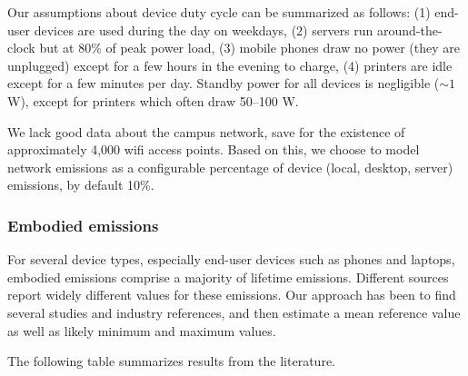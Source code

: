 \documentclass[11pt]{article}
\begin{document}
Our assumptions about device duty cycle can be summarized as follows: (1) end-user devices are used during the day on weekdays, (2) servers run around-the-clock but at 80\% of peak power load, (3) mobile phones draw no power (they are unplugged) except for a few hours in the evening to charge, (4) printers are idle except for a few minutes per day. Standby power for all devices is negligible ($\sim 1$ W), except for printers which often draw 50--100 W.

We lack good data about the campus network, save for the existence of approximately 4,000 wifi access points. Based on this, we choose to model network emissions as a configurable percentage of device (local, desktop, server) emissions, by default 10\%.

\subsubsection*{Embodied emissions}

For several device types, especially end-user devices such as phones and laptops, embodied emissions
comprise a majority of lifetime emissions. Different sources report widely different values for these emissions. Our approach has been to find several studies and industry references, and then estimate a mean reference value as well as likely minimum and maximum values.

The following table summarizes results from the literature.
\end{document}
